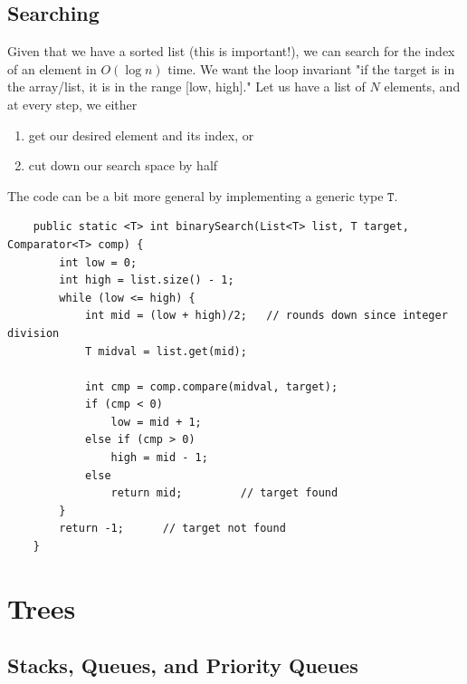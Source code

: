 \documentclass{article}
\begin{document}
  \subsection{Searching}

    \begin{definition}
    Given that we have a sorted list (this is important!), we can search for the index of an element in $O(\log{n})$ time. We want the loop invariant "if the target is in the array/list, it is in the range [low, high]." Let us have a list of $N$ elements, and at every step, we either 
    \begin{enumerate}
        \item get our desired element and its index, or 
        \item cut down our search space by half
    \end{enumerate}
    The code can be a bit more general by implementing a generic type $\texttt{T}$. 
    \begin{lstlisting}
    public static <T> int binarySearch(List<T> list, T target, Comparator<T> comp) {
        int low = 0; 
        int high = list.size() - 1; 
        while (low <= high) {
            int mid = (low + high)/2;   // rounds down since integer division
            T midval = list.get(mid); 
            
            int cmp = comp.compare(midval, target); 
            if (cmp < 0) 
                low = mid + 1; 
            else if (cmp > 0) 
                high = mid - 1; 
            else 
                return mid;         // target found 
        }
        return -1;      // target not found 
    }
    \end{lstlisting}
    \end{definition}

\section{Trees}

  \subsection{Stacks, Queues, and Priority Queues}
\end{document}
